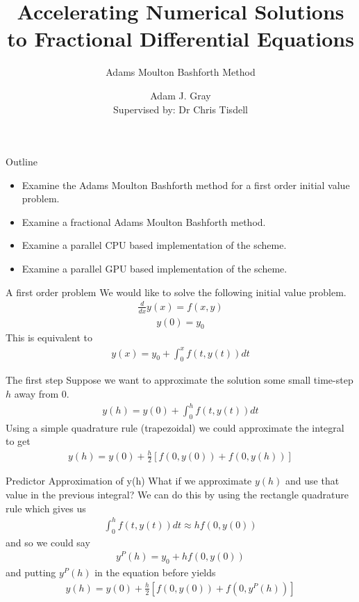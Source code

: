 \documentclass[pdf]{beamer}
\title{Accelerating Numerical Solutions to Fractional Differential Equations}
\subtitle{Adams Moulton Bashforth Method}
\author[Adam J. Gray]{Adam J. Gray\\{\small Supervised by: Dr Chris Tisdell}}
\institute{
	School of Mathematics and Statistics \\
	University of New South Wales
}
\begin{document}
\begin{frame}
	\titlepage
\end{frame}


\begin{frame}{Outline}
    \begin{itemize}
        \item Examine the Adams Moulton Bashforth method for a first order initial value problem.
        \item Examine a fractional Adams Moulton Bashforth method.
        \item Examine a parallel CPU based implementation of the scheme.
        \item Examine a parallel GPU based implementation of the scheme.
    \end{itemize}
\end{frame}

\begin{frame}{A first order problem}
We would like to solve the following initial value problem.
\begin{align*}
    \frac{d}{dx} y(x) = f(x,y)
\end{align*}
\begin{align*}
    y(0) = y_0
\end{align*}
This is equivalent to
\begin{align*}
    y(x) = y_0 + \int_0^x f(t, y(t))dt
\end{align*}
\end{frame}

\begin{frame}{The first step}
    Suppose we want to approximate the solution some small time-step $ h $ away from $ 0 $.
    \begin{align*}
        y(h) = y(0) + \int_0^h f(t, y(t)) dt
    \end{align*}
    Using a simple quadrature rule (trapezoidal) we could approximate the integral to get
    \begin{align*}
        y(h) = y(0) + \frac{h}{2} \left[ f(0, y(0)) + f(0, y(h)) \right]
    \end{align*}
\end{frame}

\begin{frame}{Predictor Approximation of y(h)}
    What if we approximate $ y(h) $ and use that value in the previous integral?
    We can do this by using the rectangle quadrature rule which
    gives us
    \begin{align*}
        \int_0^h f(t, y(t)) dt \approx h f(0, y(0))
    \end{align*}
    and so we could say
    \begin{align*}
        y^{P}(h) = y_0 + h f(0, y(0))
    \end{align*}
    and putting $y^{P}(h) $ in the equation before yields
    \begin{align*}
        y(h) = y(0) + \frac{h}{2} \left[ f(0, y(0)) + f(0, y^P(h)) \right]
    \end{align*}
\end{frame}
\end{document}
